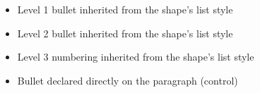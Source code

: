 \documentclass[11pt,a4paper]{article}
\begin{document}
\begin{itemize}
\item Level 1 bullet inherited from the shape's list style
\item Level 2 bullet inherited from the shape's list style
\item Level 3 numbering inherited from the shape's list style
\end{itemize}

\begin{itemize}
\item Bullet declared directly on the paragraph (control)
\end{itemize}
\end{document}
